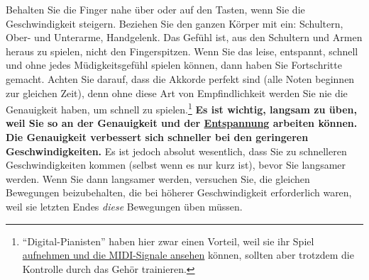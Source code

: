 Behalten Sie die Finger nahe über oder auf den Tasten, wenn Sie die Geschwindigkeit steigern.
Beziehen Sie den ganzen Körper mit ein: Schultern, Ober- und Unterarme, Handgelenk.
Das Gefühl ist, aus den Schultern und Armen heraus zu spielen, nicht den Fingerspitzen.
Wenn Sie das leise, entspannt, schnell und ohne jedes Müdigkeitsgefühl spielen können, dann haben Sie Fortschritte gemacht.
Achten Sie darauf, dass die Akkorde perfekt sind (alle Noten beginnen zur gleichen Zeit), denn ohne diese Art von Empfindlichkeit werden Sie nie die Genauigkeit haben, um schnell zu spielen.\footnote{\enquote{Digital-Pianisten} haben hier zwar einen Vorteil, weil sie ihr Spiel \hyperlink{c1iii13MIDI}{aufnehmen und die MIDI-Signale ansehen} können, sollten aber trotzdem die Kontrolle durch das Gehör trainieren.}
\textbf{Es ist wichtig, langsam zu üben, weil Sie so an der Genauigkeit und der \hyperlink{c1ii14}{Entspannung} arbeiten können.
Die Genauigkeit verbessert sich schneller bei den geringeren Geschwindigkeiten.}
Es ist jedoch absolut wesentlich, dass Sie zu schnelleren Geschwindigkeiten kommen (selbst wenn es nur kurz ist), bevor Sie langsamer werden.
Wenn Sie dann langsamer werden, versuchen Sie, die gleichen Bewegungen beizubehalten, die bei höherer Geschwindigkeit erforderlich waren, weil sie letzten Endes \textit{diese} Bewegungen üben müssen.



